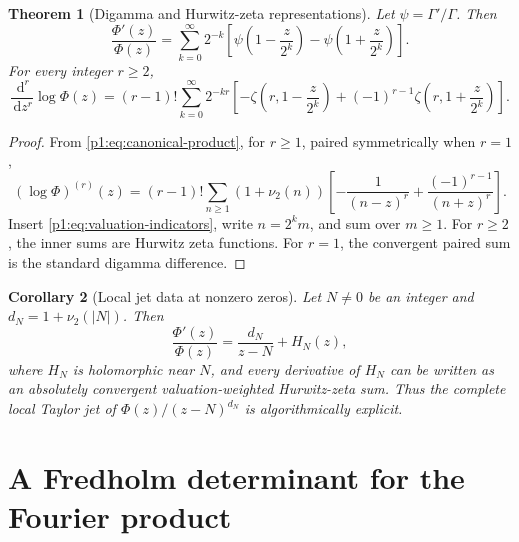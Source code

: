 \documentclass[11pt]{article}
\newtheorem{theorem}{Theorem}[section]
\newtheorem{corollary}[theorem]{Corollary}
\theoremstyle{definition}
\theoremstyle{remark}
\newcommand{\dd}{\,\mathrm d}
\begin{document}
\begin{theorem}[Digamma and Hurwitz-zeta representations]\label{p1:thm:hurwitz}
Let \(\psi=\Gamma'/\Gamma\).  Then
\begin{equation}
 \boxed{
 \frac{\Phi'(z)}{\Phi(z)}
 =\sum_{k=0}^{\infty}2^{-k}
 \left[
 \psi\!\left(1-\frac{z}{2^k}\right)
 -\psi\!\left(1+\frac{z}{2^k}\right)
 \right].
 }                                                           \label{p1:eq:logder-digamma}
\end{equation}
For every integer \(r\ge2\),
\begin{equation}
 \boxed{
 \frac{\dd^r}{\dd z^r}\log\Phi(z)
 =(r-1)!\sum_{k=0}^{\infty}2^{-kr}
 \left[
 -\zeta\!\left(r,1-\frac{z}{2^k}\right)
 +(-1)^{r-1}\zeta\!\left(r,1+\frac{z}{2^k}\right)
 \right].
 }                                                           \label{p1:eq:logder-hurwitz}
\end{equation}
\end{theorem}

\begin{proof}
From \eqref{p1:eq:canonical-product}, for \(r\ge1\), paired symmetrically when \(r=1\),
\begin{equation}
 (\log\Phi)^{(r)}(z)
 =(r-1)!\sum_{n\ge1}(1+\nu_2(n))
 \left[-\frac1{(n-z)^r}+\frac{(-1)^{r-1}}{(n+z)^r}\right].   \label{p1:eq:logder-general-zero}
\end{equation}
Insert \eqref{p1:eq:valuation-indicators}, write \(n=2^k m\), and sum over \(m\ge1\).
For \(r\ge2\), the inner sums are Hurwitz zeta functions.  For \(r=1\), the convergent
paired sum is the standard digamma difference.
\end{proof}

\begin{corollary}[Local jet data at nonzero zeros]
Let \(N\ne0\) be an integer and \(d_N=1+\nu_2(|N|)\).  Then
\begin{equation}
 \frac{\Phi'(z)}{\Phi(z)}=\frac{d_N}{z-N}+H_N(z),             \label{p1:eq:local-logder-zero}
\end{equation}
where \(H_N\) is holomorphic near \(N\), and every derivative of \(H_N\) can be written
as an absolutely convergent valuation-weighted Hurwitz-zeta sum.  Thus the complete local
Taylor jet of \(\Phi(z)/(z-N)^{d_N}\) is algorithmically explicit.
\end{corollary}

\section{A Fredholm determinant for the Fourier product}\label{p1:sec:fredholm}
\end{document}
